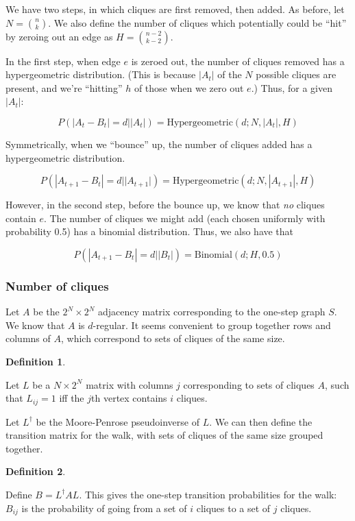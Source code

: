 \documentclass[12pt]{article}
\theoremstyle{definition}
\newtheorem{defn}{Definition}[section]
\begin{document}
We have two steps, in which cliques are first removed, then added.
As before, let $N = {n \choose k}$.
We also define the number of cliques which potentially could be ``hit'' by
zeroing out an edge as $H = {{n-2} \choose {k-2}}$.

In the first step, when edge $e$ is zeroed out, the number of cliques removed has
a hypergeometric distribution. (This is because $|A_t|$ of the $N$ possible cliques
are present, and we're ``hitting'' $h$ of those when we zero out $e$.)
Thus, for a given $|A_t|$:

\[
P(|A_t - B_t|=d||A_t|) = \text{Hypergeometric}(d; N, |A_t|, H)
\]

Symmetrically, when we ``bounce'' up, the number of cliques added has
a hypergeometric distribution.

\[
P(|A_{t+1} - B_t|=d||A_{t+1}|) = \text{Hypergeometric}(d; N, |A_{t+1}|, H)
\]

However, in the second step, before the bounce up, we know that {\em no} cliques contain $e$. The number of
cliques we might add (each chosen uniformly with probability 0.5) has 
a binomial distribution. Thus, we also have that

\[
P(|A_{t+1} - B_t|=d||B_t|) = \text{Binomial}(d; H, 0.5)
\]

\subsubsection{Number of cliques}

Let $A$ be the $2^N{\times}2^N$ adjacency matrix corresponding to the one-step graph $S$.
We know that $A$ is $d$-regular.
It seems convenient to group together rows and columns of $A$,
which correspond to sets of cliques of the same size.

\begin{defn} \label{defn:levels}

Let $L$ be a $N{\times}2^N$ matrix with columns $j$ corresponding to sets of cliques $A$, such that
$L_{ij} = 1$ iff the $j$th vertex contains $i$ cliques.

\end{defn}

Let $L^{\dagger}$ be the Moore-Penrose pseudoinverse of $L$.
We can then define the transition matrix for the walk, with sets of cliques of the same size grouped together.

\begin{defn} \label{defn:B}

Define
$B = L^{\dagger}AL$. This gives the one-step transition probabilities for the walk: $B_{ij}$ is the
probability of going from a set of $i$ cliques to a set of $j$ cliques.

\end{defn}
\end{document}
